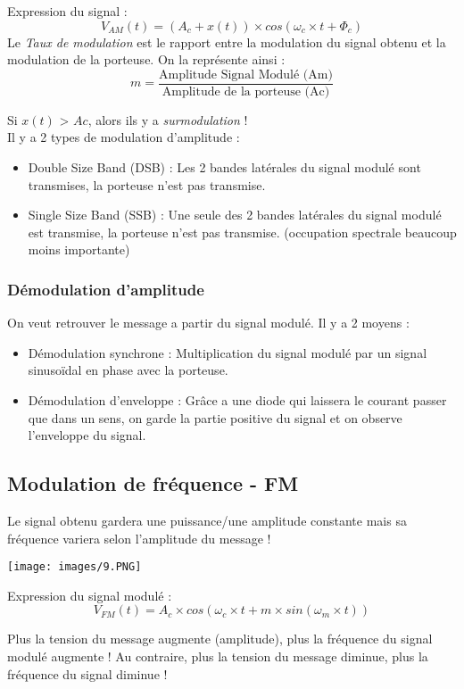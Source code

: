 \documentclass[a4paper]{article}
\begin{document}
Expression du signal :
$$ V_{AM} (t) = (A_c + x(t)) \times cos(\omega_c  \times t + \Phi_c) $$
Le \emph{Taux de modulation} est le rapport entre la modulation du signal obtenu et la modulation de la porteuse. On la représente ainsi : $$ m = \frac{\text{Amplitude Signal Modulé (Am)}}{\text{Amplitude de la porteuse (Ac)}} $$

Si $x(t)$ > $Ac$, alors ils y a \emph{surmodulation} !\\
Il y a 2 types de modulation d'amplitude :
\begin{itemize}
    \item Double Size Band (DSB) : Les 2 bandes latérales du signal modulé sont transmises, la porteuse n'est pas transmise.
    \item Single Size Band (SSB) : Une seule des 2 bandes latérales du signal modulé est transmise, la porteuse n'est pas transmise. (occupation spectrale beaucoup moins importante)
\end{itemize}

\subsubsection{Démodulation d'amplitude}
On veut retrouver le message a partir du signal modulé. Il y a 2 moyens :
\begin{itemize}
    \item Démodulation synchrone : Multiplication du signal modulé par un signal sinusoïdal en phase avec la porteuse.
    \item Démodulation d'enveloppe : Grâce a une diode qui laissera le courant passer que dans un sens, on garde la partie positive du signal et on observe l'enveloppe du signal.
\end{itemize}

\subsection{Modulation de fréquence - FM}
Le signal obtenu gardera une puissance/une amplitude constante mais sa fréquence variera selon l'amplitude du message !
\begin{center}
    \texttt{[image: images/9.PNG]}
\end{center}

Expression du signal modulé : 
$$ V_{FM}(t) = A_c \times cos(\omega_c \times t + m \times sin(\omega_m \times t)) $$

Plus la tension du message augmente (amplitude), plus la fréquence du signal modulé augmente ! 
Au contraire, plus la tension du message diminue, plus la fréquence du signal diminue !
\end{document}
